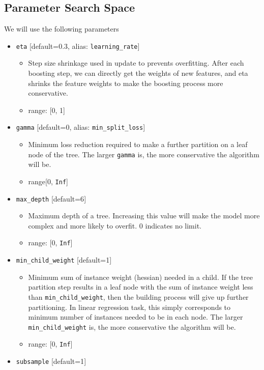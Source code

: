 \documentclass[]{book}
\providecommand{\tightlist}{%
  \setlength{\itemsep}{0pt}\setlength{\parskip}{0pt}}
\theoremstyle{definition}
\theoremstyle{definition}
\theoremstyle{definition}
\theoremstyle{remark}
\begin{document}
\subsection{Parameter Search Space}\label{parameter-search-space}

We will use the following parameters

\begin{itemize}
\tightlist
\item
  \texttt{eta} {[}default=0.3, alias: \texttt{learning\_rate}{]}

  \begin{itemize}
  \tightlist
  \item
    Step size shrinkage used in update to prevents overfitting. After
    each boosting step, we can directly get the weights of new features,
    and eta shrinks the feature weights to make the boosting process
    more conservative.
  \item
    range: {[}0, 1{]}
  \end{itemize}
\item
  \texttt{gamma} {[}default=0, alias: \texttt{min\_split\_loss}{]}

  \begin{itemize}
  \tightlist
  \item
    Minimum loss reduction required to make a further partition on a
    leaf node of the tree. The larger \texttt{gamma} is, the more
    conservative the algorithm will be.
  \item
    range{[}0, \texttt{Inf}{]}
  \end{itemize}
\item
  \texttt{max\_depth} {[}default=6{]}

  \begin{itemize}
  \tightlist
  \item
    Maximum depth of a tree. Increasing this value will make the model
    more complex and more likely to overfit. 0 indicates no limit.
  \item
    range: {[}0, \texttt{Inf}{]}
  \end{itemize}
\item
  \texttt{min\_child\_weight} {[}default=1{]}

  \begin{itemize}
  \tightlist
  \item
    Minimum sum of instance weight (hessian) needed in a child. If the
    tree partition step results in a leaf node with the sum of instance
    weight less than \texttt{min\_child\_weight}, then the building
    process will give up further partitioning. In linear regression
    task, this simply corresponds to minimum number of instances needed
    to be in each node. The larger \texttt{min\_child\_weight} is, the
    more conservative the algorithm will be.
  \item
    range: {[}0, \texttt{Inf}{]}
  \end{itemize}
\item
  \texttt{subsample} {[}default=1{]}


\end{itemize}
\end{document}
